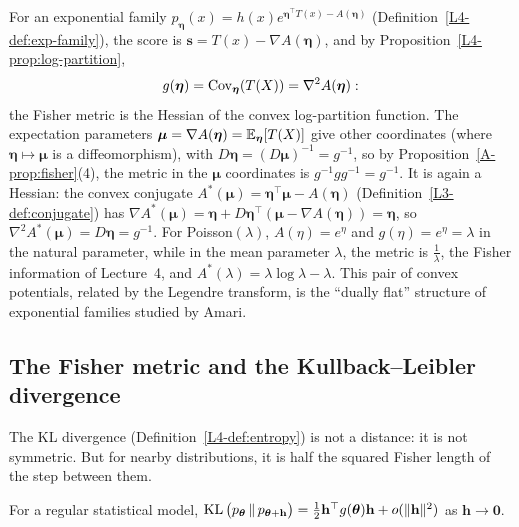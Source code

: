 \begin{example}\label{A-ex:fisher-expfam}
    For an exponential family $p_{\boldsymbol{\eta}}(x) = h(x)e^{\boldsymbol{\eta}^\top T(x) - A(\boldsymbol{\eta})}$ (Definition~\ref{L4-def:exp-family}), the score is $\mathbf{s} = T(x) - \nabla A(\boldsymbol{\eta})$, and by Proposition~\ref{L4-prop:log-partition},
    \[g(\boldsymbol{\eta}) = \operatorname{Cov}_{\boldsymbol{\eta}}(T(X)) = \nabla^2 A(\boldsymbol{\eta}):\]
    the Fisher metric is the Hessian of the convex log-partition function. The expectation parameters $\boldsymbol{\mu} = \nabla A(\boldsymbol{\eta}) = \mathbb{E}_{\boldsymbol{\eta}}[T(X)]$ give other coordinates (where $\boldsymbol{\eta} \mapsto \boldsymbol{\mu}$ is a diffeomorphism), with $D\boldsymbol{\eta} = (D\boldsymbol{\mu})^{-1} = g^{-1}$, so by Proposition~\ref{A-prop:fisher}(4), the metric in the $\boldsymbol{\mu}$ coordinates is $g^{-1}gg^{-1} = g^{-1}$. It is again a Hessian: the convex conjugate $A^*(\boldsymbol{\mu}) = \boldsymbol{\eta}^\top\boldsymbol{\mu} - A(\boldsymbol{\eta})$ (Definition~\ref{L3-def:conjugate}) has $\nabla A^*(\boldsymbol{\mu}) = \boldsymbol{\eta} + D\boldsymbol{\eta}^\top(\boldsymbol{\mu} - \nabla A(\boldsymbol{\eta})) = \boldsymbol{\eta}$, so $\nabla^2A^*(\boldsymbol{\mu}) = D\boldsymbol{\eta} = g^{-1}$. For Poisson$(\lambda)$, $A(\eta) = e^\eta$ and $g(\eta) = e^\eta = \lambda$ in the natural parameter, while in the mean parameter $\lambda$, the metric is $\frac{1}{\lambda}$, the Fisher information of Lecture~4, and $A^*(\lambda) = \lambda\log\lambda - \lambda$. This pair of convex potentials, related by the Legendre transform, is the ``dually flat'' structure of exponential families studied by Amari.
\end{example}

\subsection{The Fisher metric and the Kullback--Leibler divergence}

The KL divergence (Definition~\ref{L4-def:entropy}) is not a distance: it is not symmetric. But for nearby distributions, it is half the squared Fisher length of the step between them.

\begin{theorem}\label{A-thm:fisher-kl}
    For a regular statistical model, $\operatorname{KL}\big(p_{\boldsymbol{\theta}} \,\|\, p_{\boldsymbol{\theta} + \mathbf{h}}\big) = \frac{1}{2}\mathbf{h}^\top g(\boldsymbol{\theta})\mathbf{h} + o(\lVert \mathbf{h} \rVert^2)$ as $\mathbf{h} \to \mathbf{0}$.
\end{theorem}

